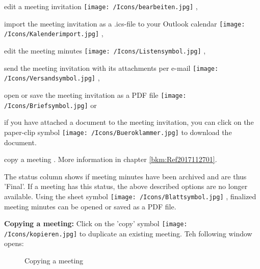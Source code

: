 \begin{compactitem}
\item edit a meeting invitation \texttt{[image: /Icons/bearbeiten.jpg]} ,
\item import the meeting invitation as a .ics-file to your Outlook calendar \texttt{[image: /Icons/Kalenderimport.jpg]} ,
\item edit the meeting minutes \texttt{[image: /Icons/Listensymbol.jpg]} ,
\item send the meeting invitation with its attachments per e-mail \texttt{[image: /Icons/Versandsymbol.jpg]} ,
\item open or save the meeting invitation as a PDF file \texttt{[image: /Icons/Briefsymbol.jpg]}  or 
\item if you have attached a document to the meeting invitation, you can click on the paper-clip symbol \texttt{[image: /Icons/Bueroklammer.jpg]}  to download the document.
\item copy a meeting . More information in chapter \ref{bkm:Ref2017112701}.
\end{compactitem}

The status column  shows if meeting minutes have been archived and are thus 'Final'. If a meeting has this status, the above described options are no longer available. Using the sheet symbol \texttt{[image: /Icons/Blattsymbol.jpg]} , finalized meeting minutes can be opened or saved as a PDF file.
	
\vspace{\baselineskip}
\label{bkm:Ref2017112701}

\textbf{Copying a meeting:} Click on the 'copy' symbol \texttt{[image: /Icons/kopieren.jpg]}  to duplicate an existing meeting. Teh following window opens: 

\begin{figure}[H]
\caption{Copying a meeting}
\end{figure}

